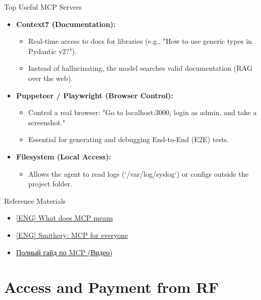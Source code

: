 \documentclass[aspectratio=169]{beamer}
\begin{document}
\begin{frame}[t]{Top Useful MCP Servers}
    \begin{itemize}
        \item \textbf{Context7 (Documentation):}
        \begin{itemize}
            \item Real-time access to docs for libraries (e.g., "How to use generic types in Pydantic v2?").
            \item Instead of hallucinating, the model searches valid documentation (RAG over the web).
        \end{itemize}
        \item \textbf{Puppeteer / Playwright (Browser Control):}
        \begin{itemize}
            \item Control a real browser: "Go to localhost:3000, login as admin, and take a screenshot."
            \item Essential for generating and debugging End-to-End (E2E) tests.
        \end{itemize}
        \item \textbf{Filesystem (Local Access):}
        \begin{itemize}
            \item Allows the agent to read logs (`/var/log/syslog`) or configs outside the project folder.
        \end{itemize}
    \end{itemize}
\end{frame}

\begin{frame}[t]{Reference Materials}
    \begin{itemize}
        \item \href{https://modelcontextprotocol.io}{[ENG] What does MCP means}
        \item \href{https://smithery.ai/}{[ENG] Smithery: MCP for everyone}
        \item \href{https://youtu.be/KnN3u1vugfA?si=GtnUHKdbaTUggaoJ}{Полный гайд по MCP (Видео)}
    \end{itemize}

\end{frame}


\section{Access and Payment from RF}
\end{document}
